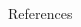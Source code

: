 \documentclass[final]{beamer}
\begin{document}
\begin{frame}{}
\begin{columns}[t]
\begin{column}{0.66\paperwidth}
\begin{columns}[t]
\begin{column}{0.32\paperwidth}
\begin{block}{References}
{
\renewcommand*{\bibfont}{\scriptsize}
\printbibliography
}
\end{block}


\end{column}

\end{columns}
\end{column}
\end{columns}

\end{frame}
\end{document}
